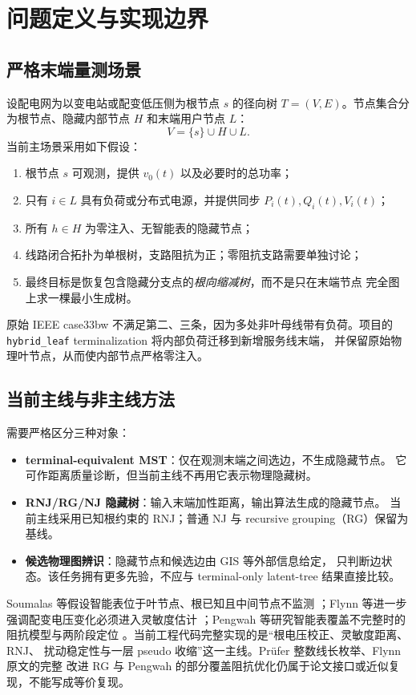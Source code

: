 \section{问题定义与实现边界}

\subsection{严格末端量测场景}

设配电网为以变电站或配变低压侧为根节点 $s$ 的径向树
$T=(V,E)$。节点集合分为根节点、隐藏内部节点 $H$ 和末端用户节点 $L$：
\[
V=\{s\}\cup H\cup L.
\]
当前主场景采用如下假设：
\begin{enumerate}
  \item 根节点 $s$ 可观测，提供 $v_0(t)$ 以及必要时的总功率；
  \item 只有 $i\in L$ 具有负荷或分布式电源，并提供同步 $P_i(t),Q_i(t),V_i(t)$；
  \item 所有 $h\in H$ 为零注入、无智能表的隐藏节点；
  \item 线路闭合拓扑为单根树，支路阻抗为正；零阻抗支路需要单独讨论；
  \item 最终目标是恢复包含隐藏分支点的\emph{根向缩减树}，而不是只在末端节点
  完全图上求一棵最小生成树。
\end{enumerate}

原始 IEEE case33bw 不满足第二、三条，因为多处非叶母线带有负荷。项目的
\texttt{hybrid\_leaf} terminalization 将内部负荷迁移到新增服务线末端，
并保留原始物理叶节点，从而使内部节点严格零注入。

\subsection{当前主线与非主线方法}

需要严格区分三种对象：
\begin{itemize}
  \item \textbf{terminal-equivalent MST}：仅在观测末端之间选边，不生成隐藏节点。
  它可作距离质量诊断，但当前主线不再用它表示物理隐藏树。
  \item \textbf{RNJ/RG/NJ 隐藏树}：输入末端加性距离，输出算法生成的隐藏节点。
  当前主线采用已知根约束的 RNJ；普通 NJ 与 recursive grouping（RG）保留为基线。
  \item \textbf{候选物理图辨识}：隐藏节点和候选边由 GIS 等外部信息给定，
  只判断边状态。该任务拥有更多先验，不应与 terminal-only latent-tree 结果直接比较。
\end{itemize}

Soumalas 等假设智能表位于叶节点、根已知且中间节点不监测
\cite{soumalas2017}；Flynn 等进一步强调配变电压变化必须进入灵敏度估计
\cite{flynn2023}；Pengwah 等研究智能表覆盖不完整时的阻抗模型与两阶段定位
\cite{pengwah2024}。当前工程代码完整实现的是“根电压校正、灵敏度距离、RNJ、
扰动稳定性与一层 pseudo 收缩”这一主线。Prüfer 整数线长枚举、Flynn 原文的完整
改进 RG 与 Pengwah 的部分覆盖阻抗优化仍属于论文接口或近似复现，不能写成等价复现。

